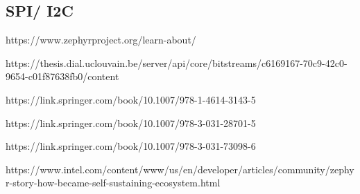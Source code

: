 \subsection{SPI/ I2C}

https://www.zephyrproject.org/learn-about/

https://thesis.dial.uclouvain.be/server/api/core/bitstreams/c6169167-70c9-42c0-9654-c01f87638fb0/content

https://link.springer.com/book/10.1007/978-1-4614-3143-5

https://link.springer.com/book/10.1007/978-3-031-28701-5

https://link.springer.com/book/10.1007/978-3-031-73098-6

https://www.intel.com/content/www/us/en/developer/articles/community/zephyr-story-how-became-self-sustaining-ecosystem.html


